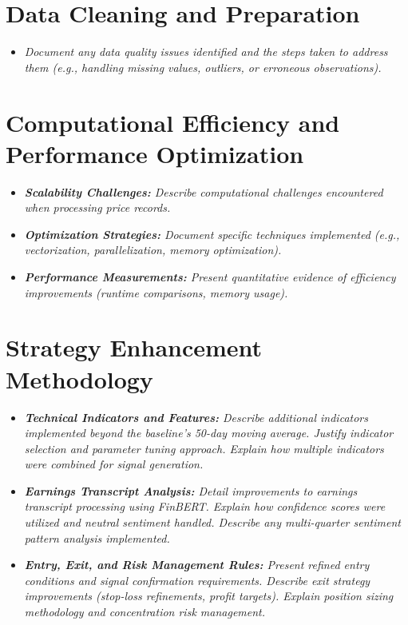 \documentclass[11pt,twoside,a4paper]{article}
\begin{document}
\section{Data Cleaning and Preparation}
\begin{itemize}
    \item \emph{Document any data quality issues identified and the steps taken to address them (e.g., handling missing values, outliers, or erroneous observations).}
\end{itemize}

\section{Computational Efficiency and Performance Optimization}
\begin{itemize}
    \item \emph{\textbf{Scalability Challenges:} Describe computational challenges encountered when processing price records.}
    \item \emph{\textbf{Optimization Strategies:} Document specific techniques implemented (e.g., vectorization, parallelization, memory optimization).}
    \item \emph{\textbf{Performance Measurements:} Present quantitative evidence of efficiency improvements (runtime comparisons, memory usage).}
\end{itemize}

\section{Strategy Enhancement Methodology}
\begin{itemize}
    \item \emph{\textbf{Technical Indicators and Features:} Describe additional indicators implemented beyond the baseline's 50-day moving average. Justify indicator selection and parameter tuning approach. Explain how multiple indicators were combined for signal generation.}
    \item \emph{\textbf{Earnings Transcript Analysis:} Detail improvements to earnings transcript processing using FinBERT. Explain how confidence scores were utilized and neutral sentiment handled. Describe any multi-quarter sentiment pattern analysis implemented.}
    \item \emph{\textbf{Entry, Exit, and Risk Management Rules:} Present refined entry conditions and signal confirmation requirements. Describe exit strategy improvements (stop-loss refinements, profit targets). Explain position sizing methodology and concentration risk management.}
\end{itemize}
\end{document}
